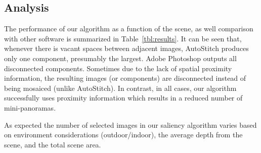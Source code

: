 


\subsection{Analysis}

The performance of our algorithm as a function of the scene, as well
comparison with other software is summarized in
Table~\ref{tbl:results}.  It can be seen that, whenever there is
vacant spaces between adjacent images, AutoStitch produces only
one component, presumably the largest.  Adobe Photoshop outputs all disconnected
components. Sometimes due to the lack of spatial proximity
information, the resulting images (or components) are disconnected instead of being 
mosaiced (unlike AutoStitch). In contrast, in all cases, our algorithm
successfully uses proximity information which results in a reduced number of mini-panoramas. 

As expected the number of selected images in our saliency algorithm
varies based on environment considerations (outdoor/indoor), the
average depth from the scene, and the total scene area.
 
